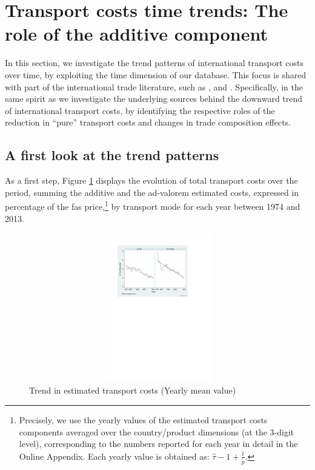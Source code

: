 \documentclass[a4paper,11pt]{article}
\begin{document}
\section{Transport costs time trends: The role of the additive component}\label{sec:results_trends}

In this section, we investigate the trend patterns of international transport costs over time, by exploiting the time dimension of our database.
This focus is shared with part of the international trade literature, such as \cite{Lafourcade_Thisse}, \cite{hummels2007} and \cite{Behar_Venables}.
Specifically, in the same spirit as \cite{hummels2007} we investigate the underlying sources behind the downward trend of international transport costs, by identifying the respective roles of the reduction in ``pure'' transport costs and changes in trade composition effects.


\subsection{A first look at the trend patterns}

As a first step, Figure \ref{fig:Trends_in_TC} displays the evolution of total transport costs over the period, summing the additive and the ad-valorem estimated costs, expressed in percentage of the fas price,\footnote{Precisely, we use the yearly values of the estimated transport costs components averaged over the country/product dimensions (at the 3-digit level), corresponding to the numbers reported for each year in detail in the Online Appendix.
Each yearly value is obtained as: $\widehat{\tau}-1+\frac{\widehat{t}}{\widetilde{p}}$.} by transport mode for each year between 1974 and 2013.

\begin{figure}[htbp]
\caption{Trend in estimated transport costs (Yearly mean value)}
\label{fig:Trends_in_TC}
\begin{center}
\includegraphics[width=14cm, height=6.5cm]{Figure1_Trend_of_totalTC_bymode.pdf}
\end{center}
\end{figure}
\end{document}
